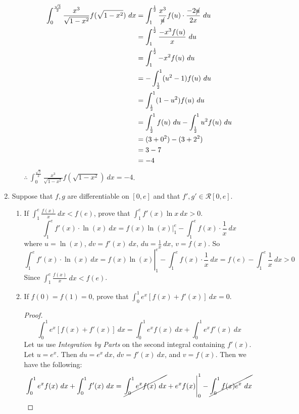 \documentclass[12pt,letterpaper]{article}
\theoremstyle{case}
\theoremstyle{definition}
\begin{document}
\begin{enumerate}
\begin{enumerate}
\begin{align*}
				\int_{0}^{\frac{\sqrt{3}}{2}} \frac{x^3}{\sqrt{1-x^2}}f(\sqrt{1-x^2})\ dx &= \int_{1}^{\frac{1}{2}} \frac{x^3}{\cancel{u}} f(u) \cdot \frac{-2\cancel{u}}{2x}\ du \\
				&= \int_{1}^{\frac{1}{2}} \frac{-x^3 f(u)}{x}\ du \\
				&= \int_{1}^{\frac{1}{2}} -x^2f(u)\ du \\
				&= -\int_{\frac{1}{2}}^{1} (u^2-1) f(u)\ du \\
				&= \int_{\frac{1}{2}}^{1} (1-u^2) f(u)\ du \\
				&= \int_{\frac{1}{2}}^{1} f(u)\ du - \int_{\frac{1}{2}}^{1} u^2 f(u)\ du \\
				&= (3+0^2)-(3+2^2) \\
				&= 3-7 \\
				&= -4
			\end{align*}
			$\therefore\ \displaystyle\int_{0}^{\frac{\sqrt{3}}{2}} \frac{x^3}{\sqrt{1-x^2}} f(\sqrt{1-x^2})\ dx = -4$.
		\end{enumerate}
		\item Suppose that $f,g$ are differentiable on $[0,e]$ and that $f', g' \in \mathcal{R}[0,e]$.
		\begin{enumerate}
			\item If $\displaystyle\int_{1}^{e} \frac{f(x)}{x}\ dx < f(e)$, prove that $\displaystyle\int_{1}^{e} f'(x) \ln x\ dx > 0$.
			\\\[\int_{1}^{e} f'(x)\cdot \ln (x)\ dx = \left.f(x)\ln(x)\right|_1^e - \int_{1}^{e} f(x) \cdot \frac{1}{x}\ dx\]
			where $u=\ln (x)$, $dv=f'(x)\ dx$, $du=\frac{1}{x}\ dx$, $v=f(x)$. So 
			\[\left.\int_{1}^{e} f'(x)\cdot \ln (x)\ dx = f(x)\ln(x)\right|_1^e - \int_{1}^{e} f(x) \cdot \frac{1}{x}\ dx=f(e)-\int_{1}^{e} \frac{1}{x}\ dx > 0\]
			Since $\int_{1}^{e} \frac{f(x)}{x}\ dx < f(e)$.\\
			\item If $f(0)=f(1)=0$, prove that $\displaystyle\int_{0}^{1} e^x [f(x)+f'(x)]\ dx =0$.
			\begin{proof}
				\[\int_{0}^{1}e^x \left[f(x)+f'(x)\right]\ dx = \int_{0}^{1} e^xf(x)\ dx +\int_{0}^{1} e^xf'(x)\ dx\]
				Let us use \textit{Integration by Parts} on the second integral containing $f'(x)$. Let $u=e^x$. Then $du=e^x\ dx$, $dv=f'(x)\ dx$, and $v=f(x)$. Then we have the following:
				\begin{align*}
					\int_{0}^{1} e^xf(x)\ dx + \int_{0}^{1} f'(x)\ dx &= \left.\cancel{\int_{0}^{1} e^xf(x)\ dx} + e^xf(x)\right|_0^1 - \cancel{\int_{0}^{1} f(x)e^x\ dx} \\

\end{align*}
\end{proof}
\end{enumerate}
\end{enumerate}
\end{document}
